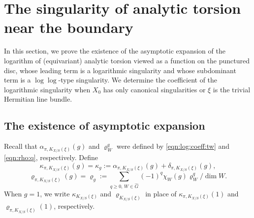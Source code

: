 \documentclass[amscd, leqno]{amsart}
\theoremstyle{plain}
\theoremstyle{definition}
\theoremstyle{remark}
\begin{document}
\section
{The singularity of analytic torsion near the boundary}
\label{sect:5}
In this section, we prove the existence of the asymptotic expansion of the logarithm of (equivariant) analytic torsion 
viewed as a function on the punctured disc, whose leading term is a logarithmic singularity and whose subdominant term is 
a $\log\log$-type singularity. We determine the coefficient of the logarithmic singularity 
when $X_{0}$ has only canonical singularities or $\xi$ is the trivial Hermitian line bundle. 




\subsection
{The existence of asymptotic expansion}
\label{sect:5.1}
\par
Recall that $\alpha_{\pi, K_{X/S}(\xi)}(g)$ and $\varrho^{q}_{W}$ were defined by \eqref{eqn:log:coeff:tw} and \eqref{eqn:rho:q}, respectively. 
Define
\begin{equation}
\label{eqn:def:kappa}
\kappa_{\pi, K_{X/S}(\xi)}(g) = \kappa_{g} := \alpha_{\pi, K_{X/S}(\xi)}(g) + \delta_{\pi, K_{X/S}(\xi)}(g),
\end{equation}
\begin{equation}
\label{eqn:def:rho}
\varrho_{\pi, K_{X/S}(\xi)}(g) = \varrho_{g} := \sum_{q\geq0,\,W\in\widehat{G}} (-1)^{q} \chi_{W}(g) \varrho_{W}^{q}/\dim W.
\end{equation}
When $g=1$, we write $\kappa_{K_{X/S}(\xi)}$ and $\varrho_{K_{X/S}(\xi)}$ in place of $\kappa_{\pi, K_{X/S}(\xi)}(1)$ and 
$\varrho_{\pi, K_{X/S}(\xi)}(1)$, respectively.
\end{document}
